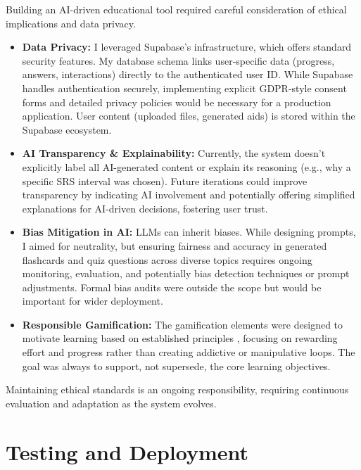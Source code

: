 \documentclass[
	letterpaper,
	11pt
]{jdf}
\begin{document}
Building an AI-driven educational tool required careful consideration of ethical implications and data privacy.

\begin{itemize}
    \item \textbf{Data Privacy:} I leveraged Supabase's infrastructure, which offers standard security features. My database schema links user-specific data (progress, answers, interactions) directly to the authenticated user ID. While Supabase handles authentication securely, implementing explicit GDPR-style consent forms and detailed privacy policies would be necessary for a production application. User content (uploaded files, generated aids) is stored within the Supabase ecosystem.
    \item \textbf{AI Transparency \& Explainability:} Currently, the system doesn't explicitly label all AI-generated content or explain its reasoning (e.g., why a specific SRS interval was chosen). Future iterations could improve transparency by indicating AI involvement and potentially offering simplified explanations for AI-driven decisions, fostering user trust.
    \item \textbf{Bias Mitigation in AI:} LLMs can inherit biases. While designing prompts, I aimed for neutrality, but ensuring fairness and accuracy in generated flashcards and quiz questions across diverse topics requires ongoing monitoring, evaluation, and potentially bias detection techniques or prompt adjustments. Formal bias audits were outside the scope but would be important for wider deployment.
    \item \textbf{Responsible Gamification:} The gamification elements were designed to motivate learning based on established principles \cite{kapp2012, ryan2000}, focusing on rewarding effort and progress rather than creating addictive or manipulative loops. The goal was always to support, not supersede, the core learning objectives.
\end{itemize}
Maintaining ethical standards is an ongoing responsibility, requiring continuous evaluation and adaptation as the system evolves.

\section{Testing and Deployment}
\end{document}
